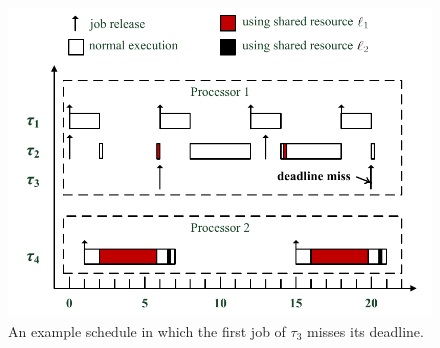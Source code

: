 \begin{figure}[!ht]
\captionsetup{belowskip=-1pt}
\begin{center}
\includegraphics[width=12cm]{Counterexample}
\caption{An example schedule in which the first job of $\tau_3$ misses its deadline. 
}
\label{fig:counterexample}
\end{center}
\end{figure}
